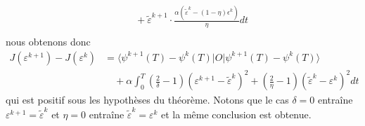 \begin{ proof }
\begin{align*}
&\quad + \tilde{\varepsilon}^{k+1} \cdot \frac{\alpha (\tilde{\varepsilon}^{k}-(1-\eta)\epsilon^k)}{\eta}dt\\
\end{align*}
nous obtenons donc
\begin{align*}
J(\varepsilon^{k+1})-J(\varepsilon^{k}) &= \langle \psi^{k+1}(T) - \psi^{k}(T)|O| \psi^{k+1}(T) - \psi^{k}(T) \rangle\\
& \quad + \alpha \int_{0}^{T} (\frac{2}{\delta}-1)(\varepsilon^{k+1}-\tilde{\varepsilon}^k)^2 + (\frac{2}{\eta}-1)(\tilde{\varepsilon}^k-\varepsilon^{k})^2 dt
\end{align*}
qui est positif sous les hypothèses du théorème. Notons que le cas $\delta=0$ entraîne $\varepsilon^{k+1}=\tilde{\varepsilon}^k$ et $\eta=0$ entraîne $\tilde{\varepsilon}^{k}=\varepsilon^k$ et la même conclusion est obtenue.
\end{ proof }
